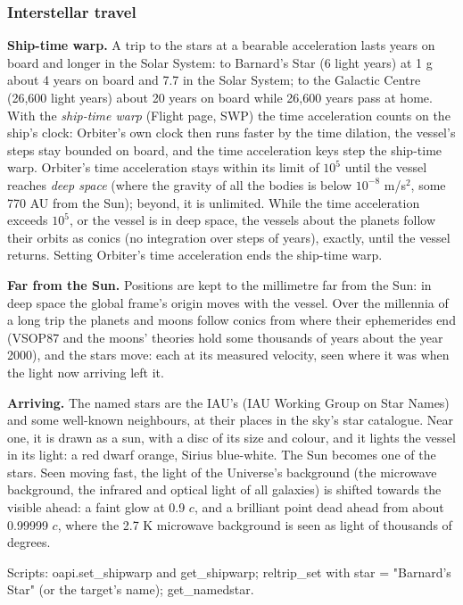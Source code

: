 \documentclass[Orbiter User Manual.tex]{subfiles}
\begin{document}
\subsubsection{Interstellar travel}
\textbf{Ship-time warp.} A trip to the stars at a bearable acceleration lasts years on board and longer in the Solar System: to Barnard's Star (6 light years) at 1 g about 4 years on board and 7.7 in the Solar System; to the Galactic Centre (26,600 light years) about 20 years on board while 26,600 years pass at home. With the \textit{ship-time warp} (Flight page, SWP) the time acceleration counts on the ship's clock: Orbiter's own clock then runs faster by the time dilation, the vessel's steps stay bounded on board, and the time acceleration keys step the ship-time warp. Orbiter's time acceleration stays within its limit of $10^5$ until the vessel reaches \textit{deep space} (where the gravity of all the bodies is below $10^{-8}$ m/s$^2$, some 770 AU from the Sun); beyond, it is unlimited. While the time acceleration exceeds $10^5$, or the vessel is in deep space, the vessels about the planets follow their orbits as conics (no integration over steps of years), exactly, until the vessel returns. Setting Orbiter's time acceleration ends the ship-time warp.

\textbf{Far from the Sun.} Positions are kept to the millimetre far from the Sun: in deep space the global frame's origin moves with the vessel. Over the millennia of a long trip the planets and moons follow conics from where their ephemerides end (VSOP87 and the moons' theories hold some thousands of years about the year 2000), and the stars move: each at its measured velocity, seen where it was when the light now arriving left it.

\textbf{Arriving.} The named stars are the IAU's (IAU Working Group on Star Names) and some well-known neighbours, at their places in the sky's star catalogue. Near one, it is drawn as a sun, with a disc of its size and colour, and it lights the vessel in its light: a red dwarf orange, Sirius blue-white. The Sun becomes one of the stars. Seen moving fast, the light of the Universe's background (the microwave background, the infrared and optical light of all galaxies) is shifted towards the visible ahead: a faint glow at 0.9 $c$, and a brilliant point dead ahead from about 0.99999 $c$, where the 2.7 K microwave background is seen as light of thousands of degrees.

Scripts: oapi.set\_shipwarp and get\_shipwarp; reltrip\_set with star = "Barnard's Star" (or the target's name); get\_namedstar.
\end{document}
